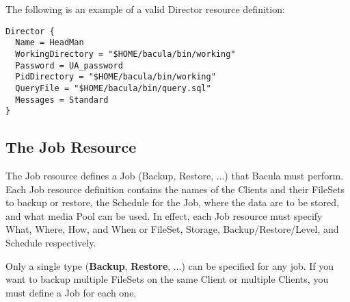 The following is an example of a valid Director resource definition: 

\footnotesize
\begin{verbatim}
Director {
  Name = HeadMan
  WorkingDirectory = "$HOME/bacula/bin/working"
  Password = UA_password
  PidDirectory = "$HOME/bacula/bin/working"
  QueryFile = "$HOME/bacula/bin/query.sql"
  Messages = Standard
}
\end{verbatim}
\normalsize

\subsection*{The Job Resource}
\label{JobResource}

The Job resource defines a Job (Backup, Restore, ...) that Bacula must
perform. Each Job resource definition contains the names of the Clients and
their FileSets to backup or restore, the Schedule for the Job, where the data
are to be stored, and what media Pool can be used. In effect, each Job
resource must specify What, Where, How, and When or FileSet, Storage,
Backup/Restore/Level, and Schedule respectively. 

Only a single type ({\bf Backup}, {\bf Restore}, ...) can be specified for any
job. If you want to backup multiple FileSets on the same Client or multiple
Clients, you must define a Job for each one. 

